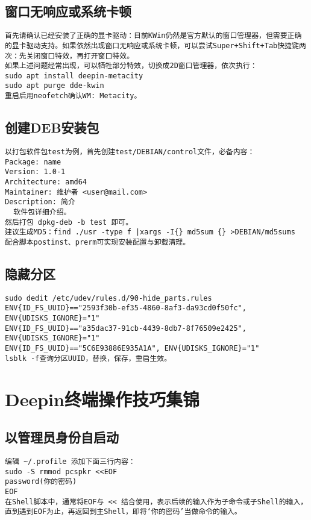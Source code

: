 \documentclass[a4paper,fontset=fandol,zihao=-4,linespread=1.2,oneside]{ctexbook}
\begin{document}
\section{窗口无响应或系统卡顿}
\begin{lstlisting}
首先请确认已经安装了正确的显卡驱动：目前KWin仍然是官方默认的窗口管理器，但需要正确的显卡驱动支持。如果依然出现窗口无响应或系统卡顿，可以尝试Super+Shift+Tab快捷键两次：先关闭窗口特效，再打开窗口特效。
如果上述问题经常出现，可以牺牲部分特效，切换成2D窗口管理器，依次执行：
sudo apt install deepin-metacity
sudo apt purge dde-kwin
重启后用neofetch确认WM: Metacity。
\end{lstlisting}

\section{创建DEB安装包}
\begin{lstlisting}
以打包软件包test为例，首先创建test/DEBIAN/control文件，必备内容：
Package: name
Version: 1.0-1
Architecture: amd64
Maintainer: 维护者 <user@mail.com>
Description: 简介
  软件包详细介绍。
然后打包 dpkg-deb -b test 即可。
建议生成MD5：find ./usr -type f |xargs -I{} md5sum {} >DEBIAN/md5sums
配合脚本postinst、prerm可实现安装配置与卸载清理。
\end{lstlisting}

\section{隐藏分区}
\begin{lstlisting}
sudo dedit /etc/udev/rules.d/90-hide_parts.rules
ENV{ID_FS_UUID}=="2593f30b-ef35-4860-8af3-da93cd0f50fc", ENV{UDISKS_IGNORE}="1"
ENV{ID_FS_UUID}=="a35dac37-91cb-4439-8db7-8f76509e2425", ENV{UDISKS_IGNORE}="1"
ENV{ID_FS_UUID}=="5C6E93886E935A1A", ENV{UDISKS_IGNORE}="1"
lsblk -f查询分区UUID，替换，保存，重启生效。
\end{lstlisting}


\chapter{Deepin终端操作技巧集锦}

\section{以管理员身份自启动}
\begin{lstlisting}
编辑 ~/.profile 添加下面三行内容：
sudo -S rmmod pcspkr <<EOF
password(你的密码)
EOF
在Shell脚本中，通常将EOF与 << 结合使用，表示后续的输入作为子命令或子Shell的输入，直到遇到EOF为止，再返回到主Shell，即将‘你的密码’当做命令的输入。
\end{lstlisting}
\end{document}
